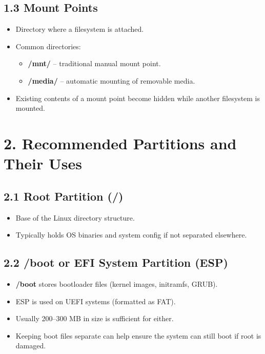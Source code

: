 \documentclass[12pt,a4paper]{report}
\begin{document}
\subsection*{1.3 Mount Points}
\begin{itemize}
    \item Directory where a filesystem is attached.  
    \item Common directories:  
    \begin{itemize}
        \item \textbf{/mnt/} – traditional manual mount point.  
        \item \textbf{/media/} – automatic mounting of removable media.  
    \end{itemize}
    \item Existing contents of a mount point become hidden while another filesystem is mounted.
\end{itemize}



\section*{2. Recommended Partitions and Their Uses}

\subsection*{2.1 Root Partition (/)}
\begin{itemize}
    \item Base of the Linux directory structure.  
    \item Typically holds OS binaries and system config if not separated elsewhere.
\end{itemize}

\subsection*{2.2 /boot or EFI System Partition (ESP)}
\begin{itemize}
    \item \textbf{/boot} stores bootloader files (kernel images, initramfs, GRUB).  
    \item ESP is used on UEFI systems (formatted as FAT).  
    \item Usually 200–300 MB in size is sufficient for either.  
    \item Keeping boot files separate can help ensure the system can still boot if root is damaged.
\end{itemize}
\end{document}
